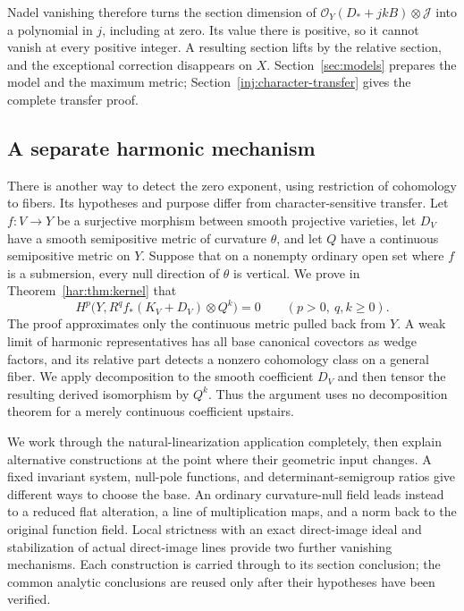 Nadel vanishing therefore turns the section dimension of
$\mathcal O_Y(D_*+jkB)\otimes\mathcal J$ into a polynomial in $j$, including at zero. Its value there is positive, so it cannot vanish at every positive integer. A resulting section lifts by the relative section, and the exceptional correction disappears on $X$. Section~\ref{sec:models} prepares the model and the maximum metric; Section~\ref{inj:character-transfer} gives the complete transfer proof.

\subsection{A separate harmonic mechanism}
There is another way to detect the zero exponent, using restriction of cohomology to fibers. Its hypotheses and purpose differ from character-sensitive transfer. Let $f:V\to Y$ be a surjective morphism between smooth projective varieties, let $D_V$ have a smooth semipositive metric of curvature $\theta$, and let $Q$ have a continuous semipositive metric on $Y$. Suppose that on a nonempty ordinary open set where $f$ is a submersion, every null direction of $\theta$ is vertical. We prove in Theorem~\ref{har:thm:kernel} that
\[
 H^p\bigl(Y,R^qf_*(K_V+D_V)\otimes Q^k\bigr)=0
 \qquad(p>0,\ q,k\ge0).
\]
The proof approximates only the continuous metric pulled back from $Y$. A weak limit of harmonic representatives has all base canonical covectors as wedge factors, and its relative part detects a nonzero cohomology class on a general fiber. We apply decomposition to the smooth coefficient $D_V$ and then tensor the resulting derived isomorphism by $Q^k$. Thus the argument uses no decomposition theorem for a merely continuous coefficient upstairs.

We work through the natural-linearization application completely, then explain alternative constructions at the point where their geometric input changes. A fixed invariant system, null-pole functions, and determinant-semigroup ratios give different ways to choose the base. An ordinary curvature-null field leads instead to a reduced flat alteration, a line of multiplication maps, and a norm back to the original function field. Local strictness with an exact direct-image ideal and stabilization of actual direct-image lines provide two further vanishing mechanisms. Each construction is carried through to its section conclusion; the common analytic conclusions are reused only after their hypotheses have been verified.

